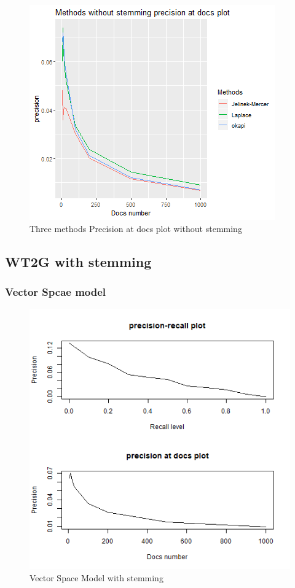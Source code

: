 \documentclass[a4pper,11pt,onecolumn]{article}
\begin{document}
    \begin{figure}[H]
    \caption{Three methods Precision at docs plot without stemming}
    \includegraphics[scale = 0.6]{no_stemming_doc.png}
    \centering
    \end{figure}

\subsection{WT2G with stemming}

\subsubsection{Vector Spcae model}
\begin{figure}[H]
\caption{Vector Space Model with stemming}
\includegraphics[scale = 0.6]{model1.png}
\centering
\end{figure}
\end{document}
